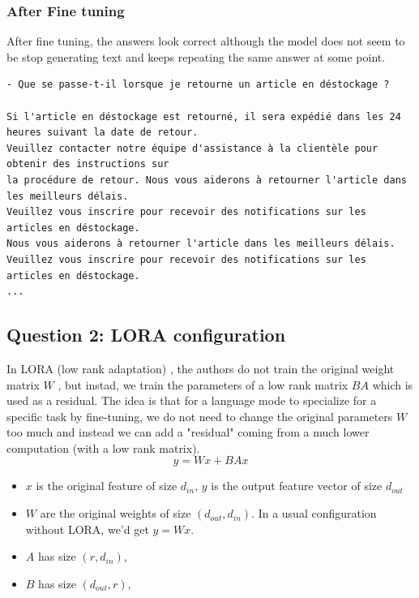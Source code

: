 \documentclass[a4paper]{article}
\begin{document}
\break
\subsubsection*{After Fine tuning}
After fine tuning, the answers look correct although the model does not seem to be stop generating text 
and keeps repeating the same answer at some point.
\begin{verbatim}
- Que se passe-t-il lorsque je retourne un article en déstockage ? 

Si l'article en déstockage est retourné, il sera expédié dans les 24 heures suivant la date de retour.
Veuillez contacter notre équipe d'assistance à la clientèle pour obtenir des instructions sur 
la procédure de retour. Nous vous aiderons à retourner l'article dans les meilleurs délais.
Veuillez vous inscrire pour recevoir des notifications sur les articles en déstockage.
Nous vous aiderons à retourner l'article dans les meilleurs délais.
Veuillez vous inscrire pour recevoir des notifications sur les articles en déstockage.
...
\end{verbatim}

\subsection*{Question 2: LORA configuration}
In LORA (low rank adaptation) \cite{hu2021lora}, the authors do not train the original weight matrix $W$ , but instad, we train the parameters of a low rank matrix $BA$ which is used as a residual.
The idea is that for a language mode to specialize for a specific task by fine-tuning, we do not need to change the original parameters $W$ too much and 
instead we can add a "residual" coming from a much lower computation (with a low rank matrix). 
$$y= Wx + BAx$$
\begin{itemize}
    \item $x$ is the original feature of size $d_{in}$, $y$ is the output feature vector of size $d_{out}$
    \item $W$ are the original weights of size $(d_{out}, d_{in})$. In a usual configuration without LORA, we'd get  $y=Wx$.
    \item $A$ has size $(r, d_{in})$,
    \item $B$ has size $(d_{out},r)$,
\end{itemize}
\end{document}

